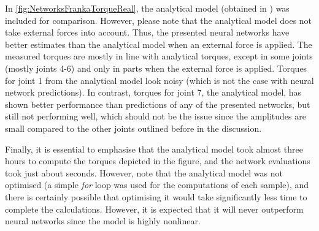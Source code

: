 In \cref{fig:NetworksFrankaTorqueReal}, the analytical model (obtained in \cite{Gaz2019}) was included for comparison. However, please note that the analytical model does not take external forces into account. Thus, the presented neural networks have better estimates than the analytical model when an external force is applied. The measured torques are mostly in line with analytical torques, except in some joints (mostly joints 4-6) and only in parts when the external force is applied. Torques for joint 1 from the analytical model look noisy (which is not the case with neural network predictions). In contrast, torques for joint 7, the analytical model, has shown better performance than predictions of any of the presented networks, but still not performing well, which should not be the issue since the amplitudes are small compared to the other joints outlined before in the discussion. 

Finally, it is essential to emphasise that the analytical model took almost three hours to compute the torques depicted in the figure, and the network evaluations took just about seconds. However, note that the analytical model was not optimised (a simple \emph{for} loop was used for the computations of each sample), and there is certainly possible that optimising it would take significantly less time to complete the calculations. However, it is expected that it will never outperform neural networks since the model is highly nonlinear.

